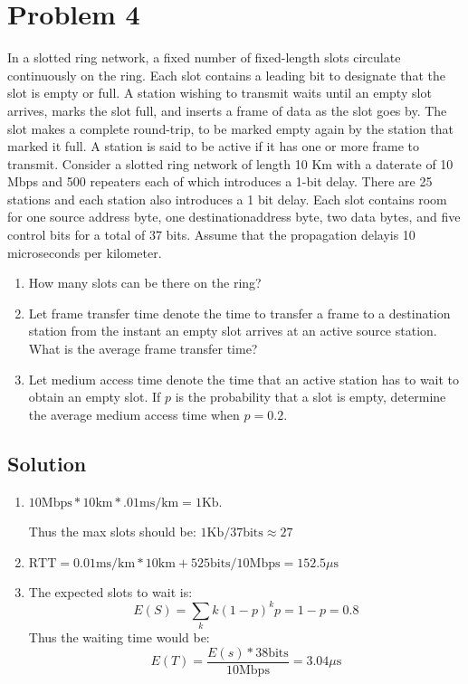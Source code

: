 
\section*{Problem 4}

In a slotted ring network, a fixed number of fixed-length slots circulate continuously on the ring.
Each slot contains a leading bit to designate that the slot is empty or full.
A station wishing to transmit waits until an empty slot arrives, marks the slot full, and inserts a frame of data as the slot goes by.
The slot makes a complete round-trip, to be marked empty again by the station that marked it full.
A station is said to be active if it has one or more frame to transmit.
Consider a slotted ring network of length 10 Km with a daterate of 10 Mbps and 500 repeaters each of which introduces a 1-bit delay.
There are 25 stations and each station also introduces a 1 bit delay.
Each slot contains room for one source address byte, one destinationaddress byte, two data bytes, and five control bits for a total of 37 bits.
Assume that the propagation delayis 10 microseconds per kilometer.

\begin{enumerate}
      \item How many slots can be there on the ring?
      \item Let frame transfer time denote the time to transfer a frame to a destination station from the instant an empty slot arrives at an active source station. What is the average frame transfer time?
      \item Let medium access time denote the time that an active station has to wait to obtain an empty slot.
            If $p$ is the probability that a slot is empty, determine the average medium access time when $p = 0.2$.
\end{enumerate}

\subsection*{Solution}

\begin{enumerate}
      \item $ 10 \text{Mbps} * 10 \text{km} * .01 \text{ms/km} = 1 \text{Kb}$.

            Thus the max slots should be: $1 \text{Kb} / 37 \text{bits} \approx 27$

      \item $\text{RTT} = 0.01 \text{ms/km} * 10 \text{km} + 525 \text{bits} / 10 \text{Mbps} = 152.5 \mu\text{s}$

      \item The expected slots to wait is:
            $$ E(S) = \sum_k k(1-p)^kp = 1-p = 0.8 $$
            Thus the waiting time would be:
            $$E(T) = \frac{E(s) * 38 \text{bits}}{10\text{Mbps}} = 3.04 \mu\text{s}$$
\end{enumerate}